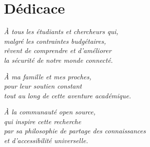 
\chapter*{Dédicace}

\vspace*{3cm}

\begin{center}
\textit{À tous les étudiants et chercheurs qui,}\\
\textit{malgré les contraintes budgétaires,}\\
\textit{rêvent de comprendre et d'améliorer}\\
\textit{la sécurité de notre monde connecté.}
\end{center}

\vspace{2cm}

\begin{center}
\textit{À ma famille et mes proches,}\\
\textit{pour leur soutien constant}\\
\textit{tout au long de cette aventure académique.}
\end{center}

\vspace{2cm}

\begin{center}
\textit{À la communauté open source,}\\
\textit{qui inspire cette recherche}\\
\textit{par sa philosophie de partage des connaissances}\\
\textit{et d'accessibilité universelle.}
\end{center}

\vfill